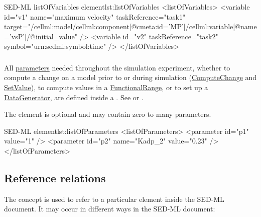 \begin{myXmlLst}{SED-ML listOfVariables element}{lst:listOfVariables}
<listOfVariables>
	<variable id="v1" name="maximum velocity" taskReference="task1" 
		target="/cellml:model/cellml:component[@cmeta:id='MP']/cellml:variable[@name='vsP']/@initial_value" />
	<variable id="v2" taskReference="task2" symbol="urn:sedml:symbol:time" />
</listOfVariables>
\end{myXmlLst}


\subsubsection{}
\label{sec:listOfParameters}
All \hyperref[class:parameter]{parameters} needed throughout the simulation experiment, whether to compute a change on a model prior to or during simulation (\hyperref[class:computeChange]{ComputeChange} and \hyperref[class:setValue]{SetValue}), to compute values in a \hyperref[class:functionalRange]{FunctionalRange}, or to set up a \hyperref[class:dataGenerator]{DataGenerator}, are defined inside a . See  or .

The element is optional and may contain zero to many parameters.

\begin{myXmlLst}{SED-ML  element}{lst:listOfParameters}
<listOfParameters>
	<parameter id="p1" value="1" />
	<parameter id="p2" name="Kadp_2" value="0.23" />
</listOfParameters>
\end{myXmlLst}

\subsection{Reference relations}
\label{sec:reference}

The  concept is used to refer to a particular element inside the SED-ML document. It may occur in different ways in the SED-ML document:

